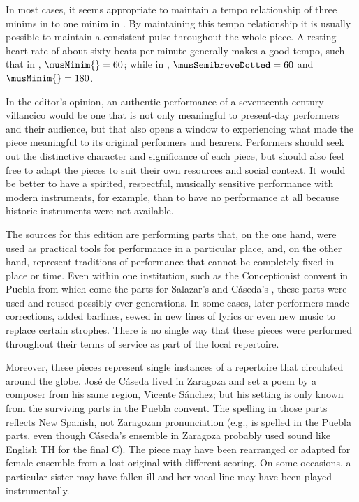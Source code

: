 In most cases, it seems appropriate to maintain a tempo relationship of three
minims in \meterCThree{} to one minim in \meterC{}.
By maintaining this tempo relationship it is usually possible to maintain a
consistent pulse throughout the whole piece.
A resting heart rate of about sixty beats per minute generally makes a good
tempo, such that in \meterC{}, $\musMinim{} = 60$; while in \meterCThree,
$\musSemibreveDotted = 60$ and $\musMinim{} = 180$.


In the editor's opinion, an authentic performance of a seventeenth-century
villancico would be one that is not only meaningful to present-day performers
and their audience, but that also opens a window to experiencing what made the
piece meaningful to its original performers and hearers.
Performers should seek out the distinctive character and significance of each
piece, but should also feel free to adapt the pieces to suit their own resources
and social context.
It would be better to have a spirited, respectful, musically sensitive
performance with modern instruments, for example, than to have no performance
at all because historic instruments were not available.

The sources for this edition are performing parts that, on the one hand,
were used as practical tools for performance in a particular place, and, on the
other hand, represent traditions of performance that cannot be completely fixed
in place or time.
Even within one institution, such as the Conceptionist convent in Puebla from
which come the parts for Salazar's  and Cáseda's
, these parts were used and reused possibly over
generations. 
In some cases, later performers made corrections, added barlines, sewed in new
lines of lyrics or even new music to replace certain strophes.
There is no single way that these pieces were performed throughout their terms
of service as part of the local repertoire.

Moreover, these pieces represent single instances of a repertoire that
circulated around the globe. 
José de Cáseda lived in Zaragoza and set a poem by a composer from his same
region, Vicente Sánchez; but his setting is only known from the surviving parts
in the Puebla convent.
The spelling in those parts reflects New Spanish, not Zaragozan pronunciation
(e.g.,  is spelled  in the
Puebla parts, even though Cáseda's ensemble in Zaragoza probably used sound like
English TH for the final C).
The piece may have been rearranged or adapted for female ensemble from a lost
original with different scoring.
On some occasions, a particular sister may have fallen ill and her vocal line
may have been played instrumentally.

